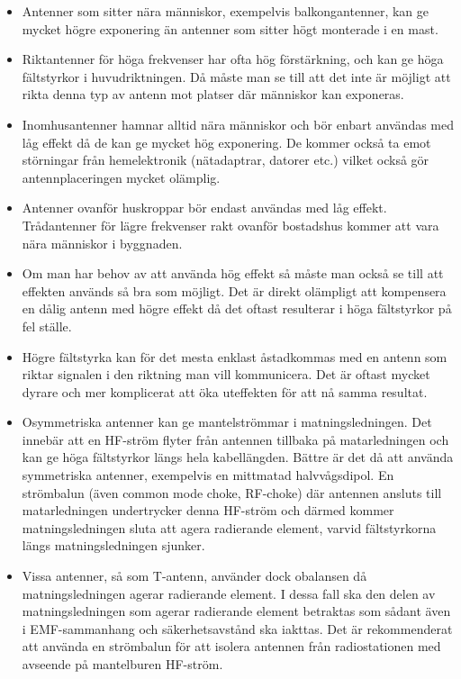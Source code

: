 \begin{itemize}
\item Antenner som sitter nära människor, exempelvis balkongantenner, kan ge
  mycket högre exponering än antenner som sitter högt monterade i en mast.

\item Riktantenner för höga frekvenser har ofta hög förstärkning, och
  kan ge höga fältstyrkor i huvudriktningen.
  Då måste man se till att det inte är möjligt att rikta denna typ av antenn
  mot platser där människor kan exponeras.

\item Inomhusantenner hamnar alltid nära människor och bör enbart användas med
  låg effekt då de kan ge mycket hög exponering.
  De kommer också ta emot störningar från hemelektronik (nätadaptrar, datorer
  etc.) vilket också gör antennplaceringen mycket olämplig.

\item Antenner ovanför huskroppar bör endast användas med låg effekt.
  Trådantenner för lägre frekvenser rakt ovanför bostadshus kommer att
  vara nära människor i byggnaden.

\item Om man har behov av att använda hög effekt så måste man också se
  till att effekten används så bra som möjligt.
  Det är direkt olämpligt att kompensera en dålig antenn med högre effekt då
  det oftast resulterar i höga fältstyrkor på fel ställe.

\item Högre fältstyrka kan för det mesta enklast åstadkommas med en
  antenn som riktar signalen i den riktning man vill kommunicera.
  Det är oftast mycket dyrare och mer komplicerat att öka uteffekten för att nå
  samma resultat.

\item Osymmetriska antenner kan ge mantelströmmar i matningsledningen.
  Det innebär att en HF-ström flyter från antennen tillbaka på matarledningen
  och kan ge höga fältstyrkor längs hela kabellängden.
  Bättre är det då att använda symmetriska antenner, exempelvis en mittmatad
  halvvågsdipol.
  En strömbalun (även common mode choke, RF-choke) där antennen ansluts till
  matarledningen undertrycker denna HF-ström och därmed kommer
  matningsledningen sluta att agera radierande element, varvid fältstyrkorna
  längs matningsledningen sjunker.

\item Vissa antenner, så som T-antenn, använder dock obalansen då
  matningsledningen agerar radierande element.
  I dessa fall ska den delen av matningsledningen som agerar radierande element
  betraktas som sådant även i EMF-sammanhang och säkerhetsavstånd ska iakttas.
  Det är rekommenderat att använda en strömbalun för att isolera antennen från
  radiostationen med avseende på mantelburen HF-ström.


\end{itemize}

